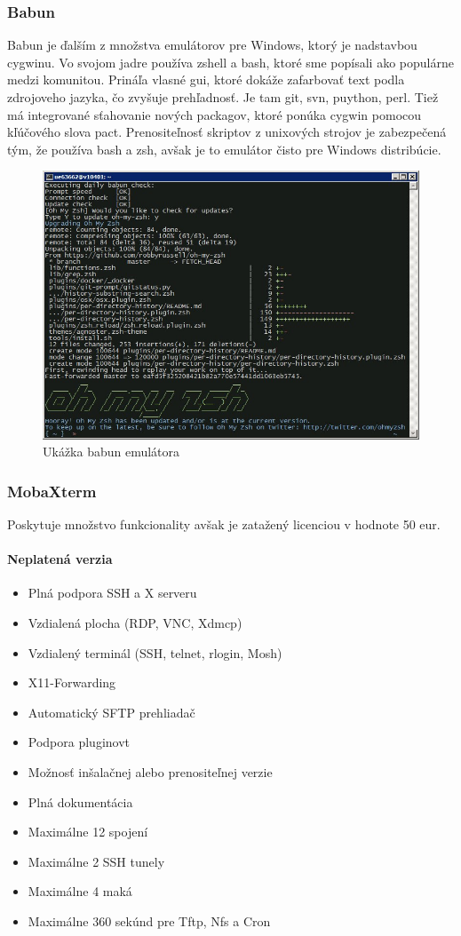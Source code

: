 \subsubsection{Babun}
\indent Babun je ďalším z množstva emulátorov pre Windows, ktorý je nadstavbou cygwinu. Vo svojom jadre používa zshell a bash, ktoré sme popísali ako populárne medzi komunitou. Prináľa vlasné gui, ktoré dokáže zafarbovať text podla zdrojoveho jazyka, čo zvyšuje prehľadnosť. Je tam git, svn, puython, perl. Tiež má integrované sťahovanie nových packagov, ktoré ponúka cygwin pomocou kľúčového slova pact. Prenositeľnosť skriptov z unixových strojov je zabezpečená tým, že používa bash a zsh, avšak je to emulátor čisto pre Windows distribúcie.
\begin{figure}[!htbp]
	\centering
	\includegraphics[scale=0.4]{img/babun.jpeg}
	\caption{Ukážka babun emulátora}
	\label{fig:test}
\end{figure}
\subsubsection{MobaXterm}
\indent Poskytuje množstvo funkcionality avšak je zatažený licenciou v hodnote 50 eur. 
\paragraph{Neplatená verzia}
\begin{itemize}
	\item Plná podpora SSH a X serveru
	\item Vzdialená plocha (RDP, VNC, Xdmcp)
	\item Vzdialený terminál (SSH, telnet, rlogin, Mosh)
	\item X11-Forwarding
	\item Automatický SFTP prehliadač
	\item Podpora pluginovt
	\item Možnosť inšalačnej alebo prenositeľnej verzie
	\item Plná dokumentácia
	\item Maximálne 12 spojení
	\item Maximálne 2 SSH tunely
	\item Maximálne 4 maká
	\item Maximálne 360 sekúnd pre Tftp, Nfs a Cron
\end{itemize}

